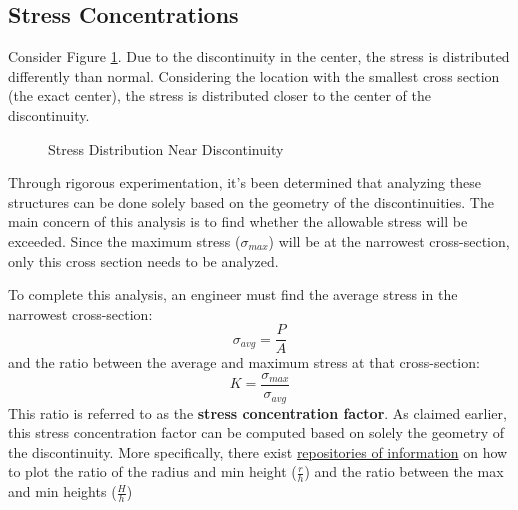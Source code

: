 \documentclass[12pt]{article}
\begin{document}
\subsection{Stress Concentrations}
\label{ssec:stressConcentrations}

Consider Figure \ref{fig:stressDistributionNearDiscontinuity}. Due to the discontinuity in the center, the stress is distributed differently than normal. Considering the location with the smallest cross section (the exact center), the stress is distributed closer to the center of the discontinuity.

\begin{figure}[H]
  \centering
  \begin{subfigure}[H]{0.45\textwidth}
    \centering
    
  \end{subfigure}
  \begin{subfigure}[H]{0.45\textwidth}
    \centering
    
  \end{subfigure}
  \caption{Stress Distribution Near Discontinuity}
  \label{fig:stressDistributionNearDiscontinuity}
\end{figure}

Through rigorous experimentation, it's been determined that analyzing these structures can be done solely based on the geometry of the discontinuities. The main concern of this analysis is to find whether the allowable stress will be exceeded. Since the maximum stress ($\sigma_{max}$) will be at the narrowest cross-section, only this cross section needs to be analyzed.

To complete this analysis, an engineer must find the average stress in the narrowest cross-section:
\begin{equation*}
  \sigma_{avg} = \frac{P}{A}
\end{equation*}
and the ratio between the average and maximum stress at that cross-section:
\begin{equation*}
  K = \frac{\sigma_{max}}{\sigma_{avg}}
\end{equation*}
This ratio is referred to as the \textbf{stress concentration factor}. As claimed earlier, this stress concentration factor can be computed based on solely the geometry of the discontinuity. More specifically, there exist \href{https://research.iaun.ac.ir/pd/jjfesharaki/pdfs/UploadFile_9038.pdf}{repositories of information} on how to plot the ratio of the radius and min height ($\frac{r}{h}$) and the ratio between the max and min heights ($\frac{H}{h}$)
\end{document}
